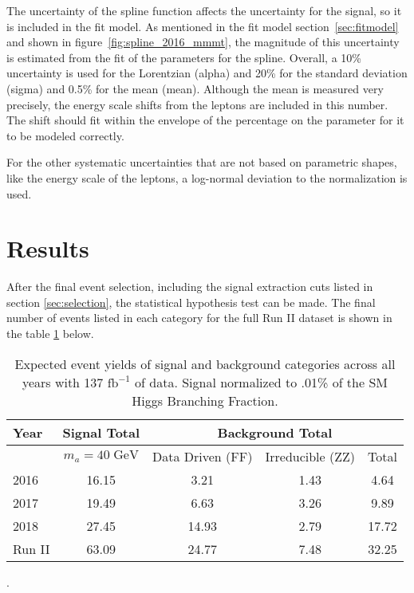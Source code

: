 The uncertainty of the spline function affects the uncertainty for the signal, so it is included in the fit model. 
As mentioned in the fit model section~\ref{sec:fitmodel} and shown in figure~\ref{fig:spline_2016_mmmt}, the magnitude of this uncertainty is estimated from the fit of the parameters for the spline. Overall, a 10\% uncertainty is used for the Lorentzian (alpha) and 20\% for the standard deviation (sigma) and 0.5\% for the mean (mean). Although the mean is measured very precisely, the energy scale shifts from the leptons are included in this number. 
The shift should fit within the envelope of the percentage on the parameter for it to be modeled correctly.


For the other systematic uncertainties that are not based on parametric shapes, like the energy scale of the leptons, a log-normal deviation to the normalization is used. 




\section{Results}
\label{sec:res}
After the final event selection, including the signal extraction cuts listed in section \ref{sec:selection}, the statistical hypothesis test can be made. 
The final number of events listed in each category for the full Run II dataset is shown in the table \ref{tab:event_yield} below.


\begin{table}[h!tbp]
\label{tab:event_yield}
\centering
\begin{tabular}{l||c|c|c||c}
\hline
Year            &  Signal Total             & \multicolumn{3}{c}{Background Total} \\\hline
                & $m_a=40\;\text{GeV}$ & Data Driven (FF)  & Irreducible (ZZ)                 & Total\\\hline
2016                      & 16.15                       & 3.21             & 1.43                   & 4.64\\\hline
2017                      & 19.49                       & 6.63             & 3.26                   & 9.89\\\hline
2018                      & 27.45                       & 14.93             & 2.79                  & 17.72\\\hline\hline
Run II                      & 63.09                       & 24.77             & 7.48                & 32.25\\\hline
\end{tabular}
\caption{Expected event yields of signal and background categories across all years with 137 $\text{fb}^{-1}$ of data. Signal normalized to .01\% of the SM Higgs Branching Fraction.
}
\end{table}.
 



